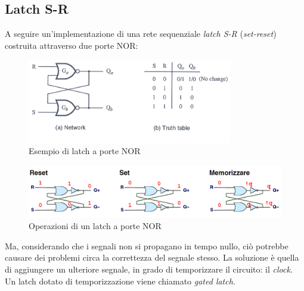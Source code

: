 \documentclass[class=book, crop=false]{standalone}
\begin{document}
\subsection{Latch S-R}
A seguire un'implementazione di una rete sequenziale \emph{latch S-R} (\emph{set-reset}) costruita attraverso due porte NOR:
\begin{figure}[H]
	\centering
	\includegraphics[width=0.8\textwidth,keepaspectratio]{es_latch.png}
	\caption{Esempio di latch a porte NOR}
\end{figure}
\begin{figure}[H]
	\centering
	\includegraphics[width=\textwidth,keepaspectratio]{operazioni_latch.png}
	\caption{Operazioni di un latch a porte NOR}
\end{figure}
Ma, considerando che i segnali non si propagano in tempo nullo, ciò potrebbe causare dei problemi circa la correttezza del segnale stesso. La soluzione è quella di aggiungere un ulteriore segnale, in grado di temporizzare il circuito: il \emph{clock}. Un latch dotato di temporizzazione viene chiamato \emph{gated latch}.
\end{document}
